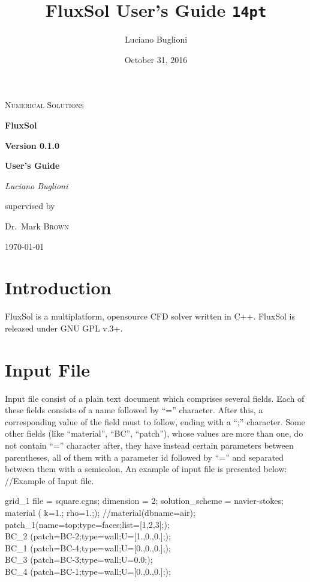 \documentclass{article}     %
\title{FluxSol User's Guide \texttt{14pt}}
\date{October 31, 2016}
\author{Luciano Buglioni}
\begin{document}

\begin{titlepage}
	\centering
	{\scshape\LARGE Numerical Solutions\par}
	\vspace{1.5cm}
	{\Huge\bfseries FluxSol \par}
	\vspace{0.5cm}
	{\huge\bfseries Version 0.1.0\par}
	\vspace{2cm}	
	{\Large\bfseries User's Guide\par}
	\vspace{3cm}
	{\Large\itshape Luciano Buglioni\par}
	\vfill
	supervised by\par
	Dr.~Mark \textsc{Brown}

	\vfill

	{\large \today\par}
\end{titlepage}

\pagebreak


\tableofcontents
\pagebreak

\pagebreak
\section{Introduction}

FluxSol is a multiplatform, opensource CFD solver written in C++.
FluxSol is released under GNU GPL v.3+.
\section{Input File}

Input file consist of a plain text document which comprises several fields. Each of these fields consists of a name followed by  “=” character. After this, a corresponding value of the field must to follow, ending with a “;” character. Some other fields (like “material”, “BC”, “patch”), whose values are more than one, do not contain “=” character after, they have instead certain parameters between parentheses, all of them with a parameter id followed by “=” and separated between them with a semicolon. An example of input file is presented below: \\

//Example of Input file.

grid\_1 {
	file = square.cgns;
	dimension = 2;
	solution\_scheme = navier-stokes;
	material 	(
				k=1.;
				rho=1.;);
	//material(dbname=air);	
	patch\_1(name=top;type=faces;list=[1,2,3];);	\\	
	BC\_2 (patch=BC-2;type=wall;U=[1.,0.,0.];);\\
	BC\_1 (patch=BC-4;type=wall;U=[0.,0.,0.];); \\
	BC\_3 (patch=BC-3;type=wall;U=0.0;); \\
	BC\_4 (patch=BC-1;type=wall;U=[0.,0.,0.];);\\	
}
\end{document}
